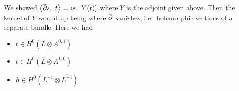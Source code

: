 \begin{remark}

We showed
\({\left\langle {\mkern 1.5mu\overline{\mkern-1.5mu{\partial}\mkern-1.5mu}\mkern 1.5mus},~{t} \right\rangle} = {\left\langle {s},~{Y (t)} \right\rangle}\)
where \(Y\) is the adjoint given above. Then the kernel of \(Y\) wound
up being where
\(\mkern 1.5mu\overline{\mkern-1.5mu{\partial}\mkern-1.5mu}\mkern 1.5mu\)
vanishes, i.e.~holomorphic sections of a separate bundle. Here we had

\begin{itemize}
\tightlist
\item
  \(t \in H^0(L\otimes A^{0, 1})\)
\item
  \({\overline{{t}}} \in H^0({\overline{{L}}}\otimes A^{1,0})\)
\item
  \(h\in H^0( L ^{-1} \otimes{\overline{{ L ^{-1} }}})\)
\end{itemize}

\end{remark}

\cleardoublepage

\renewcommand{\listtheoremname}{}
\listoftheorems[ignoreall,show={definition}, numwidth=3.5em]
\cleardoublepage

\renewcommand{\listtheoremname}{}
\listoftheorems[ignoreall,show={theorem,proposition}, numwidth=3.5em]
\cleardoublepage

\renewcommand{\listtheoremname}{}
\listoftheorems[ignoreall,show={exercise}, numwidth=3.5em]
\cleardoublepage

\listoffigures
\cleardoublepage


\printbibliography[title=Bibliography]



